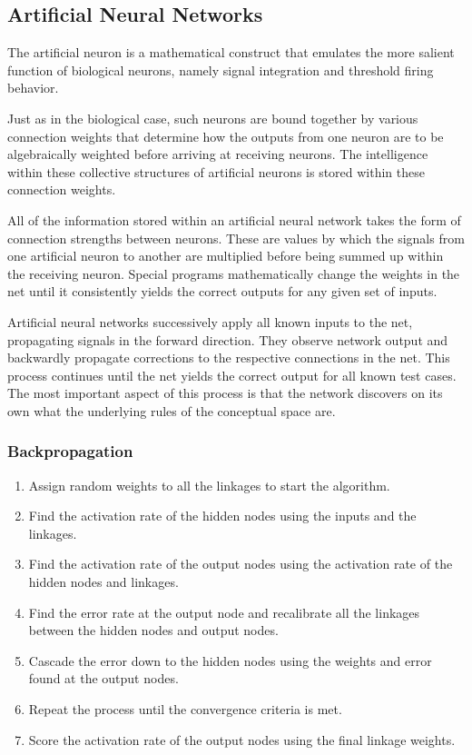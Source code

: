 \documentclass{math}
\begin{document}
\subsection*{Artificial Neural Networks}
The artificial neuron is a mathematical construct that emulates the more
salient function of biological neurons, namely signal integration and threshold
firing behavior. \par
Just as in the biological case, such neurons are bound together by various
connection weights that determine how the outputs from one neuron are to be
algebraically weighted before arriving at receiving neurons. The intelligence
within these collective structures of artificial neurons is stored within these
connection weights. \par
All of the information stored within an artificial neural network takes the
form of connection strengths between neurons. These are values by which the
signals from one artificial neuron to another are multiplied before being summed
up within the receiving neuron. Special programs mathematically change the
weights in the net until it consistently yields the correct outputs for any
given set of inputs. \par
Artificial neural networks successively apply all known inputs to the net,
propagating signals in the forward direction. They observe network output
and backwardly propagate corrections to the respective connections in the net.
This process continues until the net yields the correct output for all known
test cases. The most important aspect of this process is that the network
discovers on its own what the underlying rules of the conceptual space are.

\subsubsection*{Backpropagation}
\begin{enumerate}
  \item Assign random weights to all the linkages to start the algorithm.
  \item Find the activation rate of the hidden nodes using the inputs and the
    linkages.
  \item Find the activation rate of the output nodes using the activation rate
    of the hidden nodes and linkages.
  \item Find the error rate at the output node and recalibrate all the linkages
    between the hidden nodes and output nodes.
  \item Cascade the error down to the hidden nodes using the weights and error
    found at the output nodes.
  \item Repeat the process until the convergence criteria is met.
  \item Score the activation rate of the output nodes using the final linkage
    weights.
\end{enumerate}
\end{document}
